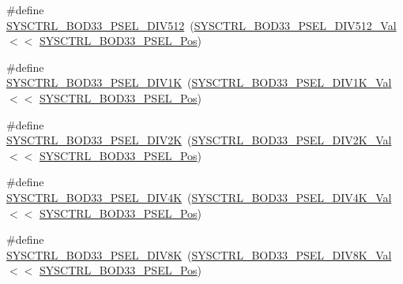 \begin{DoxyCompactItemize}
\item 
\#define \mbox{\hyperlink{group___s_a_m_d21___s_y_s_c_t_r_l_ga47205af9a6294c4cb07f154848e1c6db}{S\+Y\+S\+C\+T\+R\+L\+\_\+\+B\+O\+D33\+\_\+\+P\+S\+E\+L\+\_\+\+D\+I\+V512}}~(\mbox{\hyperlink{group___s_a_m_d21___s_y_s_c_t_r_l_ga424d90a7de1f466d27d5f90aa3bc19c2}{S\+Y\+S\+C\+T\+R\+L\+\_\+\+B\+O\+D33\+\_\+\+P\+S\+E\+L\+\_\+\+D\+I\+V512\+\_\+\+Val}} $<$$<$ \mbox{\hyperlink{group___s_a_m_d21___s_y_s_c_t_r_l_ga73a89199fbe33475f4dd5e5c84e5089d}{S\+Y\+S\+C\+T\+R\+L\+\_\+\+B\+O\+D33\+\_\+\+P\+S\+E\+L\+\_\+\+Pos}})
\item 
\#define \mbox{\hyperlink{group___s_a_m_d21___s_y_s_c_t_r_l_ga68c8e8bf0d578d9246e16bffbd65719a}{S\+Y\+S\+C\+T\+R\+L\+\_\+\+B\+O\+D33\+\_\+\+P\+S\+E\+L\+\_\+\+D\+I\+V1K}}~(\mbox{\hyperlink{group___s_a_m_d21___s_y_s_c_t_r_l_gadc93b38cb160451749cb5e30c7ec5a44}{S\+Y\+S\+C\+T\+R\+L\+\_\+\+B\+O\+D33\+\_\+\+P\+S\+E\+L\+\_\+\+D\+I\+V1\+K\+\_\+\+Val}}  $<$$<$ \mbox{\hyperlink{group___s_a_m_d21___s_y_s_c_t_r_l_ga73a89199fbe33475f4dd5e5c84e5089d}{S\+Y\+S\+C\+T\+R\+L\+\_\+\+B\+O\+D33\+\_\+\+P\+S\+E\+L\+\_\+\+Pos}})
\item 
\#define \mbox{\hyperlink{group___s_a_m_d21___s_y_s_c_t_r_l_ga3cd137e56dc1c0cecf5e7408ce50caad}{S\+Y\+S\+C\+T\+R\+L\+\_\+\+B\+O\+D33\+\_\+\+P\+S\+E\+L\+\_\+\+D\+I\+V2K}}~(\mbox{\hyperlink{group___s_a_m_d21___s_y_s_c_t_r_l_ga8a97aa63e41934e47cc2a4421c6d9aa7}{S\+Y\+S\+C\+T\+R\+L\+\_\+\+B\+O\+D33\+\_\+\+P\+S\+E\+L\+\_\+\+D\+I\+V2\+K\+\_\+\+Val}}  $<$$<$ \mbox{\hyperlink{group___s_a_m_d21___s_y_s_c_t_r_l_ga73a89199fbe33475f4dd5e5c84e5089d}{S\+Y\+S\+C\+T\+R\+L\+\_\+\+B\+O\+D33\+\_\+\+P\+S\+E\+L\+\_\+\+Pos}})
\item 
\#define \mbox{\hyperlink{group___s_a_m_d21___s_y_s_c_t_r_l_ga8670e088b6630f0593840c50f83ab273}{S\+Y\+S\+C\+T\+R\+L\+\_\+\+B\+O\+D33\+\_\+\+P\+S\+E\+L\+\_\+\+D\+I\+V4K}}~(\mbox{\hyperlink{group___s_a_m_d21___s_y_s_c_t_r_l_ga3a011b2e2e4554a87a3da77e09cbab08}{S\+Y\+S\+C\+T\+R\+L\+\_\+\+B\+O\+D33\+\_\+\+P\+S\+E\+L\+\_\+\+D\+I\+V4\+K\+\_\+\+Val}}  $<$$<$ \mbox{\hyperlink{group___s_a_m_d21___s_y_s_c_t_r_l_ga73a89199fbe33475f4dd5e5c84e5089d}{S\+Y\+S\+C\+T\+R\+L\+\_\+\+B\+O\+D33\+\_\+\+P\+S\+E\+L\+\_\+\+Pos}})
\item 
\#define \mbox{\hyperlink{group___s_a_m_d21___s_y_s_c_t_r_l_gaa8532b2b9d4dbdab2a84ad5b0353d67a}{S\+Y\+S\+C\+T\+R\+L\+\_\+\+B\+O\+D33\+\_\+\+P\+S\+E\+L\+\_\+\+D\+I\+V8K}}~(\mbox{\hyperlink{group___s_a_m_d21___s_y_s_c_t_r_l_gaf71f1b0ebea6815f734e81037b3ffce4}{S\+Y\+S\+C\+T\+R\+L\+\_\+\+B\+O\+D33\+\_\+\+P\+S\+E\+L\+\_\+\+D\+I\+V8\+K\+\_\+\+Val}}  $<$$<$ \mbox{\hyperlink{group___s_a_m_d21___s_y_s_c_t_r_l_ga73a89199fbe33475f4dd5e5c84e5089d}{S\+Y\+S\+C\+T\+R\+L\+\_\+\+B\+O\+D33\+\_\+\+P\+S\+E\+L\+\_\+\+Pos}})
$$
\end{DoxyCompactItemize}
